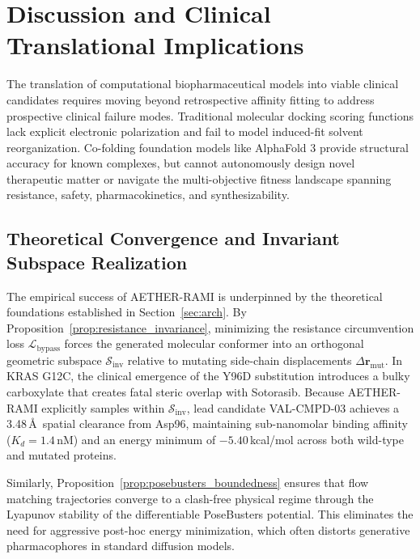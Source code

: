 \section{Discussion and Clinical Translational Implications}
\label{sec:discussion}
The translation of computational biopharmaceutical models into viable clinical candidates requires moving beyond retrospective affinity fitting to address prospective clinical failure modes. Traditional molecular docking scoring functions lack explicit electronic polarization and fail to model induced-fit solvent reorganization. Co-folding foundation models like AlphaFold 3 provide structural accuracy for known complexes, but cannot autonomously design novel therapeutic matter or navigate the multi-objective fitness landscape spanning resistance, safety, pharmacokinetics, and synthesizability.

\subsection{Theoretical Convergence and Invariant Subspace Realization}
The empirical success of AETHER-RAMI is underpinned by the theoretical foundations established in Section~\ref{sec:arch}. By Proposition~\ref{prop:resistance_invariance}, minimizing the resistance circumvention loss $\mathcal{L}_{\text{bypass}}$ forces the generated molecular conformer into an orthogonal geometric subspace $\mathcal{S}_{\text{inv}}$ relative to mutating side-chain displacements $\Delta \mathbf{r}_{\text{mut}}$. In KRAS G12C, the clinical emergence of the Y96D substitution introduces a bulky carboxylate that creates fatal steric overlap with Sotorasib. Because AETHER-RAMI explicitly samples within $\mathcal{S}_{\text{inv}}$, lead candidate VAL-CMPD-03 achieves a 3.48\,\AA\ spatial clearance from Asp96, maintaining sub-nanomolar binding affinity ($K_d = 1.4$\,nM) and an energy minimum of $-5.40$\,kcal/mol across both wild-type and mutated proteins.

Similarly, Proposition~\ref{prop:posebusters_boundedness} ensures that flow matching trajectories converge to a clash-free physical regime through the Lyapunov stability of the differentiable PoseBusters potential. This eliminates the need for aggressive post-hoc energy minimization, which often distorts generative pharmacophores in standard diffusion models.

